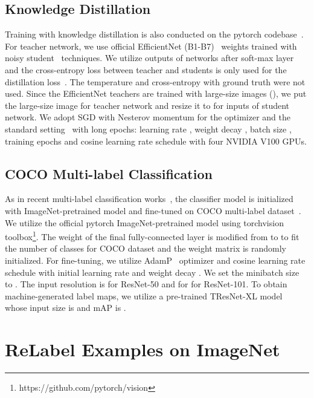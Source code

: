 \documentclass[final]{cvpr}
\newcommand\ours{{{\mbox{ReLabel}}}\xspace}
\begin{document}
\subsection{Knowledge Distillation}
\label{supp:impl_details_kd}
Training with knowledge distillation is also conducted on the pytorch codebase~\cite{timm}.
For teacher network, we use official EfficientNet (B1-B7)~\cite{efficientnet} weights trained with noisy student~\cite{xie2020noisy_student} techniques.
We utilize outputs of networks after soft-max layer and the cross-entropy loss between teacher and students is only used for the distillation loss~\cite{hinton2015distilling}.
The temperature and cross-entropy with ground truth were not used.
Since the EfficientNet teachers are trained with large-size images (), we put the large-size image for teacher network and resize it to  for inputs of student network.
We adopt SGD with Nesterov momentum for the optimizer and the standard setting~\cite{resnet} with long epochs: learning rate , weight decay , batch size , training epochs  and cosine learning rate schedule with four NVIDIA V100 GPUs.




\subsection{COCO Multi-label Classification}
\label{supp:impl_details_cocomulti}

As in recent multi-label classification works~\cite{chen2019multi,wang2017multi,you2020cross,ben2020asymmetric}, the classifier model is initialized with ImageNet-pretrained model and fine-tuned on COCO multi-label dataset~\cite{lin2014microsoft}.
We utilize the official pytorch ImageNet-pretrained model using {torchvision} toolbox\footnote{https://github.com/pytorch/vision}.
The weight of the final fully-connected layer is modified from  to  to fit the number of classes for COCO dataset and the weight matrix is randomly initialized.
For fine-tuning, we utilize AdamP~\cite{heo2020adamp} optimizer and cosine learning rate schedule with initial learning rate  and weight decay .
We set the minibatch size to .
The input resolution is  for ResNet-50 and  for for ResNet-101.
To obtain machine-generated label maps, we utilize a pre-trained TResNet-XL model~\cite{ben2020asymmetric} whose input size is  and mAP is . \section{\ours Examples on ImageNet}
\label{supp:sec:relabel_examples}
\end{document}
